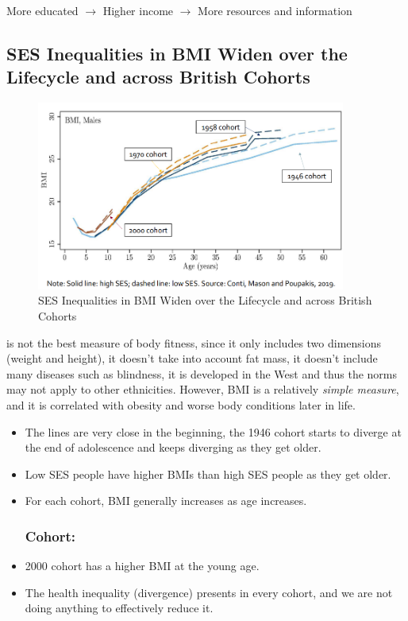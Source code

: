     More educated  $\to$  Higher income  $\to$  More resources and information

    \subsection{SES Inequalities in BMI Widen over the Lifecycle and across British Cohorts}
    
        \begin{figure}[H]%
            \centering
            \includegraphics[width=4in]{images/ch3/27.png}
            \caption{SES Inequalities in BMI Widen over the Lifecycle and across British Cohorts}
        \end{figure}
         is not the best measure of body fitness, since it only includes two dimensions (weight and height), it doesn't take into account fat mass, it doesn't include many diseases such as blindness, it is developed in the West and thus the norms may not apply to other ethnicities. However, BMI is a relatively \emph{simple measure}, and it is correlated with obesity and worse body conditions later in life.
        \begin{itemize}
            \subsubsection{Lifecycle:}
            \item The lines are very close in the beginning, the 1946 cohort starts to diverge at the end of adolescence and keeps diverging as they get older. 
            \item Low SES people have higher BMIs than high SES people as they get older.
            \item For each cohort, BMI generally increases as age increases. 
            \subsubsection{Cohort:}
            \item 2000 cohort has a higher BMI at the young age.
            \item The health inequality (divergence) presents in every cohort, and we are not doing anything to effectively reduce it.
        \end{itemize}       
        
